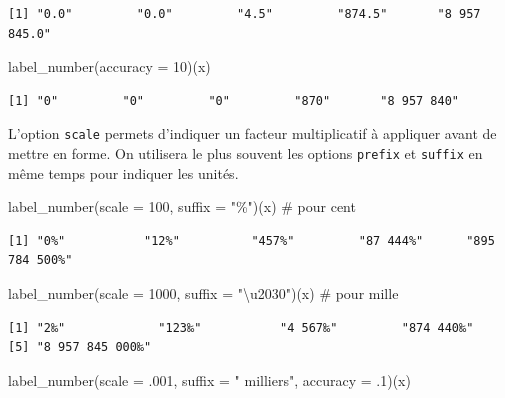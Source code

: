 \documentclass[
  letterpaper,
  DIV=11,
  numbers=noendperiod,
  oneside]{scrreprt}
\newenvironment{Shaded}{\begin{snugshade}}{\end{snugshade}}
\newcommand{\AttributeTok}[1]{\textcolor[rgb]{0.40,0.45,0.13}{#1}}
\newcommand{\CommentTok}[1]{\textcolor[rgb]{0.37,0.37,0.37}{#1}}
\newcommand{\DecValTok}[1]{\textcolor[rgb]{0.68,0.00,0.00}{#1}}
\newcommand{\FunctionTok}[1]{\textcolor[rgb]{0.28,0.35,0.67}{#1}}
\newcommand{\NormalTok}[1]{\textcolor[rgb]{0.00,0.23,0.31}{#1}}
\newcommand{\StringTok}[1]{\textcolor[rgb]{0.13,0.47,0.30}{#1}}
\begin{document}
\begin{verbatim}
[1] "0.0"         "0.0"         "4.5"         "874.5"       "8 957 845.0"
\end{verbatim}

\begin{Shaded}
\begin{Highlighting}[]
\FunctionTok{label\_number}\NormalTok{(}\AttributeTok{accuracy =} \DecValTok{10}\NormalTok{)(x)}
\end{Highlighting}
\end{Shaded}

\begin{verbatim}
[1] "0"         "0"         "0"         "870"       "8 957 840"
\end{verbatim}

L'option \texttt{scale} permets d'indiquer un facteur multiplicatif à
appliquer avant de mettre en forme. On utilisera le plus souvent les
options \texttt{prefix} et \texttt{suffix} en même temps pour indiquer
les unités.

\begin{Shaded}
\begin{Highlighting}[]
\FunctionTok{label\_number}\NormalTok{(}\AttributeTok{scale =} \DecValTok{100}\NormalTok{, }\AttributeTok{suffix =} \StringTok{"\%"}\NormalTok{)(x) }\CommentTok{\# pour cent}
\end{Highlighting}
\end{Shaded}

\begin{verbatim}
[1] "0%"           "12%"          "457%"         "87 444%"      "895 784 500%"
\end{verbatim}

\begin{Shaded}
\begin{Highlighting}[]
\FunctionTok{label\_number}\NormalTok{(}\AttributeTok{scale =} \DecValTok{1000}\NormalTok{, }\AttributeTok{suffix =} \StringTok{"\textbackslash{}u2030"}\NormalTok{)(x) }\CommentTok{\# pour mille}
\end{Highlighting}
\end{Shaded}

\begin{verbatim}
[1] "2‰"             "123‰"           "4 567‰"         "874 440‰"      
[5] "8 957 845 000‰"
\end{verbatim}

\begin{Shaded}
\begin{Highlighting}[]
\FunctionTok{label\_number}\NormalTok{(}\AttributeTok{scale =}\NormalTok{ .}\DecValTok{001}\NormalTok{, }\AttributeTok{suffix =} \StringTok{" milliers"}\NormalTok{, }\AttributeTok{accuracy =}\NormalTok{ .}\DecValTok{1}\NormalTok{)(x)}
\end{Highlighting}
\end{Shaded}
\end{document}
